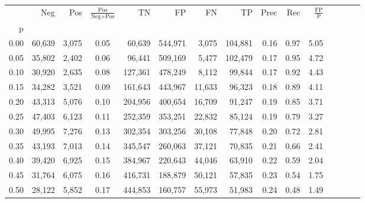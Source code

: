 \begin{tabular}{rrrcrrrrrrrrrrr}
\toprule
{} &     Neg &     Pos & $\frac{\text{Pos}}{\text{Neg}+\text{Pos}}$ &       TN &       FP &       FN &       TP &  Prec &   Rec & $\frac{\text{FP}}{\text{P}}$ \\
p    &         &         &                                            &          &          &          &          &       &       &                              \\
\midrule
0.00 &  60,639 &   3,075 &                                       0.05 &   60,639 &  544,971 &    3,075 &  104,881 &  0.16 &  0.97 &                         5.05 \\
0.05 &  35,802 &   2,402 &                                       0.06 &   96,441 &  509,169 &    5,477 &  102,479 &  0.17 &  0.95 &                         4.72 \\
0.10 &  30,920 &   2,635 &                                       0.08 &  127,361 &  478,249 &    8,112 &   99,844 &  0.17 &  0.92 &                         4.43 \\
0.15 &  34,282 &   3,521 &                                       0.09 &  161,643 &  443,967 &   11,633 &   96,323 &  0.18 &  0.89 &                         4.11 \\
0.20 &  43,313 &   5,076 &                                       0.10 &  204,956 &  400,654 &   16,709 &   91,247 &  0.19 &  0.85 &                         3.71 \\
0.25 &  47,403 &   6,123 &                                       0.11 &  252,359 &  353,251 &   22,832 &   85,124 &  0.19 &  0.79 &                         3.27 \\
0.30 &  49,995 &   7,276 &                                       0.13 &  302,354 &  303,256 &   30,108 &   77,848 &  0.20 &  0.72 &                         2.81 \\
0.35 &  43,193 &   7,013 &                                       0.14 &  345,547 &  260,063 &   37,121 &   70,835 &  0.21 &  0.66 &                         2.41 \\
0.40 &  39,420 &   6,925 &                                       0.15 &  384,967 &  220,643 &   44,046 &   63,910 &  0.22 &  0.59 &                         2.04 \\
0.45 &  31,764 &   6,075 &                                       0.16 &  416,731 &  188,879 &   50,121 &   57,835 &  0.23 &  0.54 &                         1.75 \\
0.50 &  28,122 &   5,852 &                                       0.17 &  444,853 &  160,757 &   55,973 &   51,983 &  0.24 &  0.48 &                         1.49 \\

\end{tabular}
